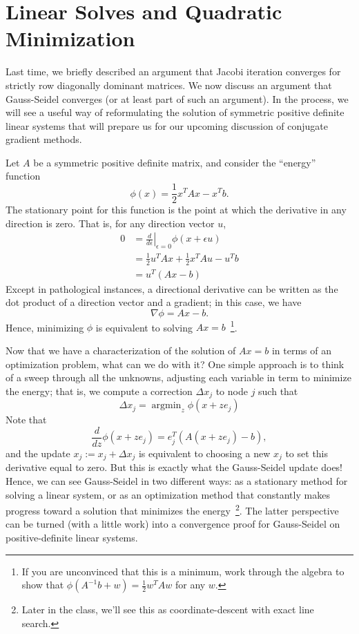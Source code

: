 \documentclass[12pt, leqno]{article}
\begin{document}
\section*{Linear Solves and Quadratic Minimization}

Last time, we briefly described an argument that Jacobi iteration
converges for strictly row diagonally dominant matrices.  We now
discuss an argument that Gauss-Seidel converges (or at least part of
such an argument).  In the process, we will see a useful way of
reformulating the solution of symmetric positive definite linear
systems that will prepare us for our upcoming discussion of conjugate
gradient methods.

Let $A$ be a symmetric positive definite matrix, and consider
the ``energy'' function
\[
  \phi(x) = \frac{1}{2} x^T A x - x^T b.
\]
The stationary point for this function is the point at which
the derivative in any direction is zero.  That is, for any
direction vector $u$,
\begin{align*}
  0
  &=\left. \frac{d}{d\epsilon} \right|_{\epsilon = 0} \phi(x+\epsilon u) \\
  &=\frac{1}{2} u^T A x + \frac{1}{2} x^T A u -  u^T b \\
  &=u^T (Ax-b)
\end{align*}
Except in pathological instances, a directional derivative can be
written as the dot product of a direction vector and a gradient;
in this case, we have
\[
  \nabla \phi = Ax-b.
\]
Hence, minimizing $\phi$ is equivalent to solving $Ax = b$~\footnote{%
If you are unconvinced that this is a minimum, work through the
algebra to show that $\phi(A^{-1} b + w) = \frac{1}{2} w^T A w$ for any $w$.}.

Now that we have a characterization of the solution of $Ax = b$
in terms of an optimization problem, what can we do with it?
One simple approach is to think of a sweep through all the unknowns,
adjusting each variable in term to minimize the energy; that is,
we compute a correction $\Delta x_j$ to node $j$ such that
\[
  \Delta x_j = \operatorname{argmin}_z \phi(x+z e_j)
\]
Note that
\[
  \frac{d}{dz} \phi(x+z e_j) = e_j^T (A(x+ze_j)-b),
\]
and the update $x_j := x_j + \Delta x_j$ is equivalent to choosing
a new $x_j$ to set this derivative equal to zero.  But this is
exactly what the Gauss-Seidel update does!  Hence, we can see
Gauss-Seidel in two different ways: as a stationary method for solving
a linear system, or as an optimization method that constantly makes
progress toward a solution that minimizes the energy~\footnote{%
Later in the class, we'll see this as coordinate-descent with
exact line search.}.
The latter perspective can be turned (with a little work) into
a convergence proof for Gauss-Seidel on positive-definite linear systems.
\end{document}
